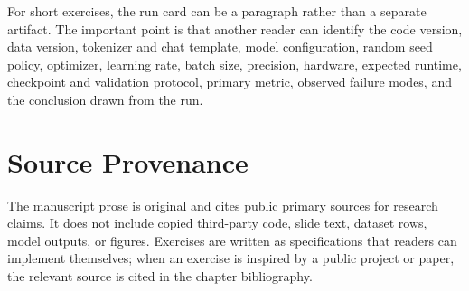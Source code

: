 For short exercises, the run card can be a paragraph rather than a separate artifact. The important point is that another reader can identify the code version, data version, tokenizer and chat template, model configuration, random seed policy, optimizer, learning rate, batch size, precision, hardware, expected runtime, checkpoint and validation protocol, primary metric, observed failure modes, and the conclusion drawn from the run.

\section{Source Provenance}
The manuscript prose is original and cites public primary sources for research claims. It does not include copied third-party code, slide text, dataset rows, model outputs, or figures. Exercises are written as specifications that readers can implement themselves; when an exercise is inspired by a public project or paper, the relevant source is cited in the chapter bibliography.
